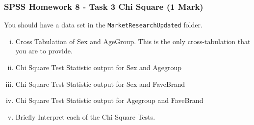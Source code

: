 \documentclass[a4paper,12pt]{article}
\begin{document}

\subsubsection*{SPSS Homework 8 - Task 3 Chi Square (1 Mark) }
 You should have a data set in the \texttt{MarketResearchUpdated} folder.

\begin{enumerate}[(i)]
	\item Cross Tabulation of Sex and AgeGroup. This is the only cross-tabulation that you are to provide.
	\item Chi Square Test Statistic output for Sex and Agegroup
	\item Chi Square Test Statistic output for Sex and FaveBrand
	\item Chi Square Test Statistic output for Agegroup and FaveBrand
	\item Briefly Interpret each of the Chi Square Tests.
\end{enumerate}

\end{document}
